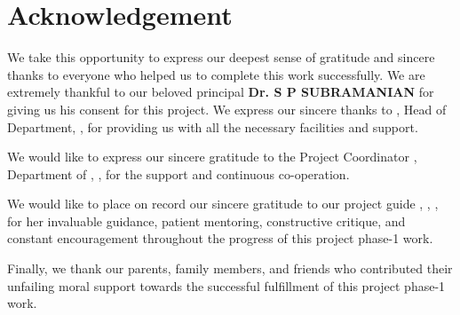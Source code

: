 \chapter*{Acknowledgement}%
%

\par We take this opportunity to express our deepest sense of gratitude and sincere thanks to everyone who helped us to complete this work successfully. We are extremely thankful to our beloved principal \textbf{Dr. S P SUBRAMANIAN} for giving us his consent for this project. We express our sincere thanks to \textbf{\hod}, Head of Department, \dept, \college\hspace*{2pt} \collegeplace \hspace*{2pt} for providing us with all the necessary facilities and support.\par

We would like to express our sincere gratitude to the Project Coordinator \textbf{\projcordinatorA}, Department of \dept, \college, \collegeplace \hspace*{2pt} for the support and continuous co-operation.

We would like to place on record our sincere gratitude to our project guide \textbf{\guide}, \guidedes, \dept, \college \hspace*{2pt} for her invaluable guidance, patient mentoring, constructive critique, and constant encouragement throughout the progress of this project phase-1 work.

Finally, we thank our parents, family members, and friends who contributed their unfailing moral support towards the successful fulfillment of this project phase-1 work.

\vspace*{30pt}
\begin{flushright}
	\textbf{\studentA}\\
	\textbf{\studentB}\\
	\textbf{\studentC}\\
	\textbf{\studentD}\\
\end{flushright}
\thispagestyle{plain}
